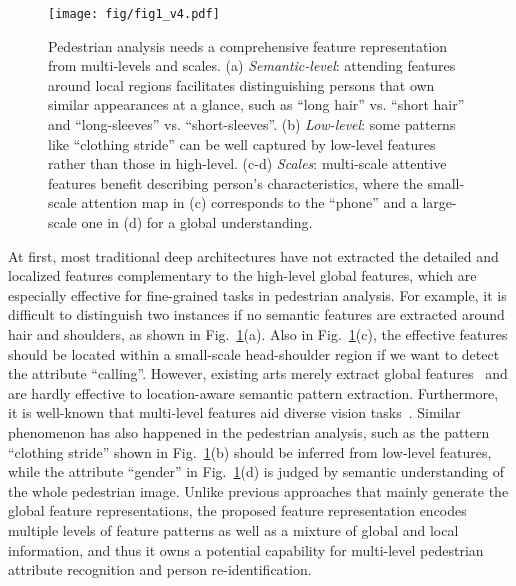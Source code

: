 \documentclass[10pt,twocolumn,letterpaper]{article}
\begin{document}
\begin{figure}[t]
\centering
\texttt{[image: fig/fig1\_v4.pdf]}
\caption{
Pedestrian analysis needs a comprehensive feature representation from multi-levels and scales.
(a) \textit{Semantic-level}: attending features around local regions facilitates distinguishing persons that own similar appearances at a glance, such as ``long hair'' vs. ``short hair'' and ``long-sleeves'' vs. ``short-sleeves''.
(b) \textit{Low-level}: some patterns like ``clothing stride'' can be well captured by low-level features rather than those in high-level.
(c-d) \textit{Scales}: multi-scale attentive features benefit describing person's characteristics, where the small-scale attention map in (c) corresponds to the ``phone'' and a large-scale one in (d) for a global understanding.
}
\label{fig:fig1}
\vspace{-5pt}
\end{figure}


At first, most traditional deep architectures have not extracted the detailed and localized features complementary to the high-level global features, which are especially effective for fine-grained tasks in pedestrian analysis.
For example, it is difficult to distinguish two instances if no semantic features are extracted around hair and shoulders, as shown in Fig.~\ref{fig:fig1}(a).
Also in Fig.~\ref{fig:fig1}(c), the effective features should be located within a small-scale head-shoulder region if we want to detect the attribute ``calling''.
However, existing arts merely extract global features~\cite{li2015multi, sudowe2015person, xiao2016learning} and are hardly effective to location-aware semantic pattern extraction.
Furthermore, it is well-known that multi-level features aid diverse vision tasks~\cite{newell2016stacked,cornia2016deep}.
Similar phenomenon has also happened in the pedestrian analysis, such as the pattern ``clothing stride'' shown in Fig.~\ref{fig:fig1}(b) should be inferred from low-level features, while the attribute ``gender'' in Fig.~\ref{fig:fig1}(d) is judged by semantic understanding of the whole pedestrian image.
Unlike previous approaches that mainly generate the global feature representations, the proposed feature representation encodes multiple levels of feature patterns as well as a mixture of global and local information, and thus it owns a potential capability for multi-level pedestrian attribute recognition and person re-identification.
\end{document}
